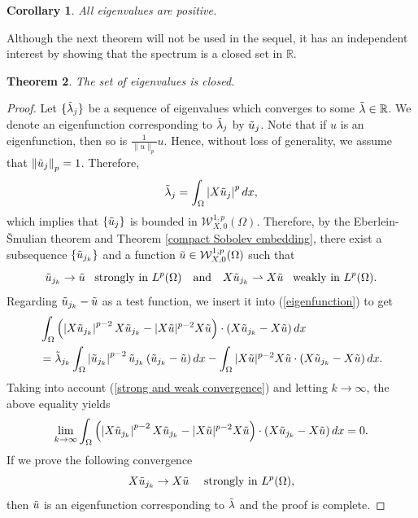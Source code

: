 \documentclass[a4paper,12pt,reqno]{amsart}
\renewcommand\eqref[1]{(\ref{#1})} %
\numberwithin{equation}{section}
\theoremstyle{plain}
\newtheorem{theorem}{Theorem}[section]
\newtheorem{corollary}[theorem]{Corollary}
\theoremstyle{definition}
\begin{document}
\begin{corollary}
All eigenvalues are  positive.    
\end{corollary}
Although the next theorem will not be used in the sequel, it has an independent interest by showing that the spectrum is a closed set in $\mathbb{R}$.
\begin{theorem}\label{closed set}
The set of eigenvalues is closed.
\end{theorem}
\begin{proof} 
Let $\{\Tilde{\lambda}_{j}\}$ be a  sequence of eigenvalues which converges to some $\Tilde{\lambda}\in \mathbb{R}$.  We denote an eigenfunction corresponding to $\Tilde{\lambda}_{j}$  by $\Tilde{u}_{j}$. Note that if $u$ is an eigenfunction, then so is $\frac{1}{\|u\|_{p}}u$. Hence, without loss of generality, we assume that
$\left\|\Tilde{u}_{j}\right\|_{p}=1$. Therefore,
$$
\Tilde{\lambda}_{j}=\int_{\Omega}\left|X\Tilde{u}_{j}\right|^p d x,
$$
which implies that $\{\Tilde{u}_{j}\}$ is bounded in $\mathcal{W}_{X,0}^{1, p}(\Omega)$. Therefore, by the Eberlein-\v{S}mulian theorem  and Theorem \ref{compact Sobolev embedding}, there exist a subsequence $\{\Tilde{u}_{j_{k}}\}$ and a function $\Tilde{u}\in \mathcal{W}_{X,0}^{1, p}(\Omega)$ such that
\begin{equation}\label{strong and weak convergence}
\Tilde{u}_{j_{k}} \to \Tilde{u}\enspace \text{ strongly in } L^{p}(\Omega)\quad\text{and} \quad X \Tilde{u}_{j_{k}} \rightharpoonup  X \Tilde{u} \enspace \text{ weakly in } L^{p}(\Omega). 
\end{equation}
Regarding $\Tilde{u}_{j_{k}}-\Tilde{u}$ as a test function, we insert it into \eqref{eigenfunction} to get
\begin{equation*}
\begin{aligned}
&\int_{\Omega}\left(\left|X \Tilde{u}_{j_{k}}\right|^{p-2} X \Tilde{u}_{j_{k}}-|X \Tilde{u}|^{p-2} X \Tilde{u}\right) \cdot \left(X\Tilde{u}_{j_{k}}-X \Tilde{u}\right) d x \\
&=\Tilde{\lambda}_{j_{k}} \int_{\Omega}\left|\Tilde{u}_{j_{k}}\right|^{p-2} \Tilde{u}_{j_{k}}\left(\Tilde{u}_{j_{k}}-\Tilde{u}\right) d x-\int_{\Omega}|X \Tilde{u}|^{p-2} X \Tilde{u} \cdot\left(X \Tilde{u}_{j_{k}}-X \Tilde{u}\right) d x .
\end{aligned}
\end{equation*}
Taking into account \eqref{strong and weak convergence} and letting $k\to \infty$, the above equality yields 
\begin{equation}\label{closed set: limit}
\lim _{k \rightarrow \infty} \int_{\Omega}\left(\left|X \Tilde{u}_{j_{k}}\right|^{p-2} X \Tilde{u}_{j_{k}}-|X \Tilde{u}|^{p-2} X \Tilde{u}\right) \cdot\left(X \Tilde{u}_{j_{k}}-X \Tilde{u}\right) d x=0 .
\end{equation}
If we prove the following convergence
\begin{equation}\label{closed set: strong convergence of the horizontal gradient}
X \Tilde{u}_{j_{k}} \to  X \Tilde{u}\quad \text{ strongly in } L^{p}(\Omega), 
\end{equation}
then $\Tilde{u}$ is an eigenfunction corresponding to $\Tilde{\lambda}$ and the proof is complete. 


\end{proof}
\end{document}
